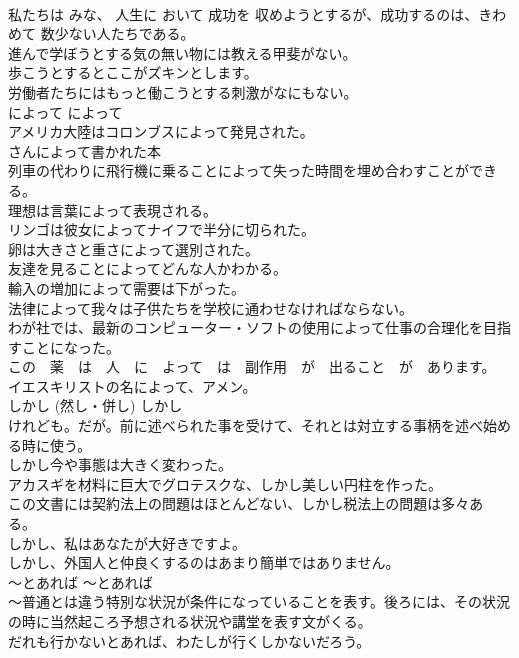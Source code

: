 \documentclass[8pt]{extreport}
\begin{document}
\begin{CJK}{UTF8}{min}
\\	私たちは みな、 人生に おいて 成功を 収めようとするが、成功するのは、きわめて 数少ない人たちである。   
\\	進んで学ぼうとする気の無い物には教える甲斐がない。   
\\	歩こうとするとここがズキンとします。   
\\	労働者たちにはもっと働こうとする刺激がなにもない。   
\\	によって	によって	
\\	アメリカ大陸はコロンブスによって発見された。  
\\	さんによって書かれた本  
\\	列車の代わりに飛行機に乗ることによって失った時間を埋め合わすことができる。  
\\	理想は言葉によって表現される。  
\\	リンゴは彼女によってナイフで半分に切られた。  
\\	卵は大きさと重さによって選別された。  
\\	友達を見ることによってどんな人かわかる。  
\\	輸入の増加によって需要は下がった。  
\\	法律によって我々は子供たちを学校に通わせなければならない。  
\\	わが社では、最新のコンピューター・ソフトの使用によって仕事の合理化を目指すことになった。  
\\	この　薬　は　人　に　よって　は　副作用　が　出ること　が　あります。   
\\	イエスキリストの名によって、アメン。  
\\	しかし (然し・併し)	しかし	
\\	けれども。だが。前に述べられた事を受けて、それとは対立する事柄を述べ始める時に使う。	
\\	しかし今や事態は大きく変わった。  
\\	アカスギを材料に巨大でグロテスクな、しかし美しい円柱を作った。  
\\	この文書には契約法上の問題はほとんどない、しかし税法上の問題は多々ある。  
\\	しかし、私はあなたが大好きですよ。  
\\	しかし、外国人と仲良くするのはあまり簡単ではありません。  
\\	〜とあれば	〜とあれば	
\\	〜普通とは違う特別な状況が条件になっていることを表す。後ろには、その状況の時に当然起ころ予想される状況や講堂を表す文がくる。
\\	だれも行かないとあれば、わたしが行くしかないだろう。  

\end{CJK}
\end{document}
